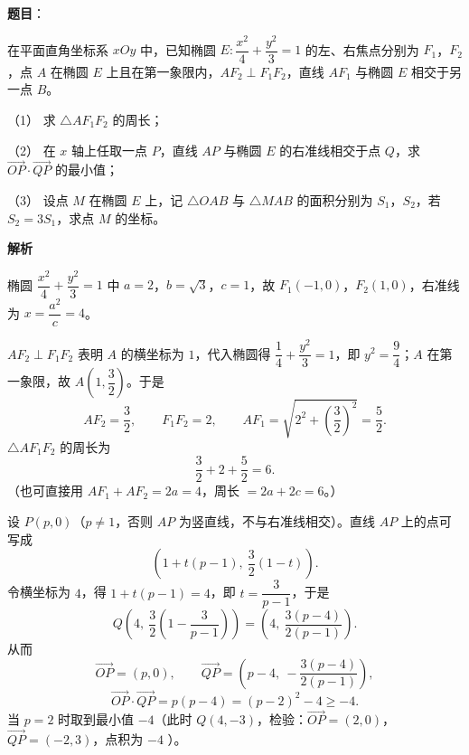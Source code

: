 \begin{answer}


\end{answer}
\begin{answer}

\textbf{题目}：

在平面直角坐标系 $xOy$ 中，已知椭圆 $E:\dfrac{x^2}4+\dfrac{y^2}3=1$ 的左、右焦点分别为 $F_1$，$F_2$，点 $A$ 在椭圆 $E$ 上且在第一象限内，$AF_2\perp F_1F_2$，直线 $AF_1$ 与椭圆 $E$ 相交于另一点 $B$。

（1） 求 $\triangle AF_1F_2$ 的周长；

（2） 在 $x$ 轴上任取一点 $P$，直线 $AP$ 与椭圆 $E$ 的右准线相交于点 $Q$，求 $\overrightarrow{OP}\cdot\overrightarrow{QP}$ 的最小值；

（3） 设点 $M$ 在椭圆 $E$ 上，记 $\triangle OAB$ 与 $\triangle MAB$ 的面积分别为 $S_1$，$S_2$，若 $S_2=3S_1$，求点 $M$ 的坐标。

\textbf{解析}

椭圆 $\dfrac{x^2}4+\dfrac{y^2}3=1$ 中 $a=2$，$b=\sqrt3$，$c=1$，故 $F_1(-1,0)$，$F_2(1,0)$，右准线为 $x=\dfrac{a^2}c=4$。


$AF_2\perp F_1F_2$ 表明 $A$ 的横坐标为 $1$，代入椭圆得 $\dfrac14+\dfrac{y^2}3=1$，即 $y^2=\dfrac94$；$A$ 在第一象限，故 $A\left(1,\dfrac32\right)$。于是
\nopagebreak[4]
\[AF_2=\frac32,\qquad F_1F_2=2,\qquad AF_1=\sqrt{2^2+\left(\frac32\right)^2}=\frac52 .\]
$\triangle AF_1F_2$ 的周长为
\nopagebreak[4]
\[\frac32+2+\frac52=6 .\]
（也可直接用 $AF_1+AF_2=2a=4$，周长 $=2a+2c=6$。）


设 $P(p,0)$（$p\neq1$，否则 $AP$ 为竖直线，不与右准线相交）。直线 $AP$ 上的点可写成
\nopagebreak[4]
\[\left(1+t(p-1),\ \frac32(1-t)\right).\]
令横坐标为 $4$，得 $1+t(p-1)=4$，即 $t=\dfrac3{p-1}$，于是
\nopagebreak[4]
\[Q\left(4,\ \frac32\left(1-\frac3{p-1}\right)\right)=\left(4,\ \frac{3(p-4)}{2(p-1)}\right).\]
从而
\nopagebreak[4]
\[\overrightarrow{OP}=(p,0),\qquad \overrightarrow{QP}=\left(p-4,\ -\frac{3(p-4)}{2(p-1)}\right),\]
\nopagebreak[4]
\[\overrightarrow{OP}\cdot\overrightarrow{QP}=p(p-4)=(p-2)^2-4\geqslant-4 .\]
当 $p=2$ 时取到最小值 $-4$（此时 $Q(4,-3)$，检验：$\overrightarrow{OP}=(2,0)$，$\overrightarrow{QP}=(-2,3)$，点积为 $-4$ ）。


\end{answer}
